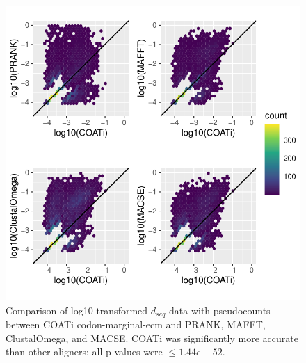 \documentclass[
]{article}
\begin{document}
\begin{figure}

{\centering \includegraphics{figures/dseq_plots_mar-ecm} 

}

\caption{\label{fig:dseq-mar-ecm} Comparison of log10-transformed $d_{seq}$ data with pseudocounts between COATi codon-marginal-ecm and PRANK, MAFFT, ClustalOmega, and MACSE. COATi was significantly more accurate than other aligners; all p-values were $\leq 1.44e-52$.}\label{fig:dseq4}
\end{figure}
\end{document}
